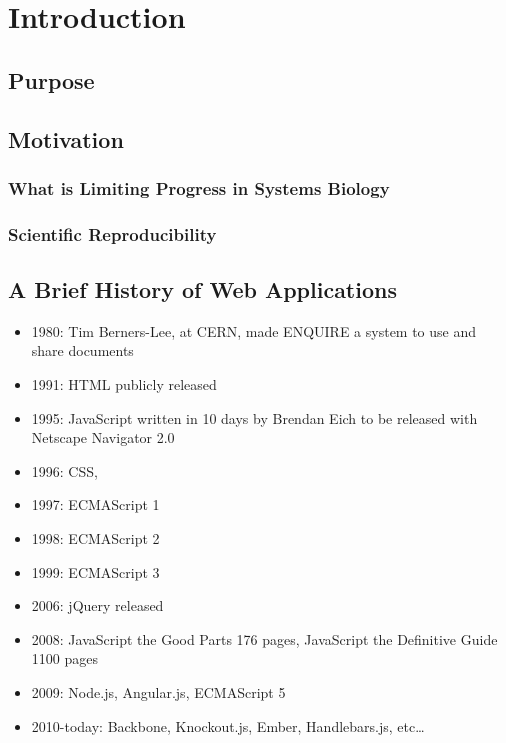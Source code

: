 \chapter{Introduction}

\section{Purpose}

\section{Motivation}

\subsection{What is Limiting Progress in Systems Biology}

\subsection{Scientific Reproducibility}

\section{A Brief History of Web Applications}
\autocite{w3c2014history}
\autocite{berners2014design}
\begin{itemize}
  \item 1980: Tim Berners-Lee, at CERN, made ENQUIRE a system to use and share documents
  \item 1991: HTML publicly released
  \item 1995: JavaScript written in 10 days by Brendan Eich to be released with Netscape Navigator 2.0
  \item 1996: CSS, 
  \item 1997: ECMAScript 1
  \item 1998: ECMAScript 2
  \item 1999: ECMAScript 3
  \item 2006: jQuery released
  \item 2008: JavaScript the Good Parts 176 pages, JavaScript the Definitive Guide 1100 pages
  \item 2009: Node.js, Angular.js, ECMAScript 5
  \item 2010-today: Backbone, Knockout.js, Ember, Handlebars.js, etc\ldots

\end{itemize}


